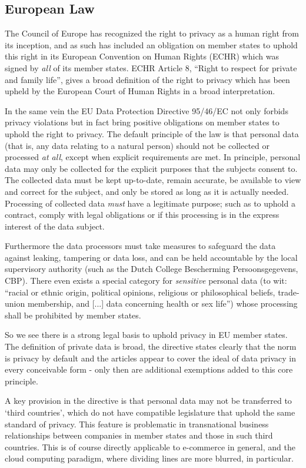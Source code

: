 \documentclass[11pt, a4paper]{article}
\begin{document}
\subsection{European Law}
The Council of Europe has recognized the right to privacy as a human right from its inception, and as such has included an obligation on member states to uphold this right in its European Convention on Human Rights (ECHR) which was signed by \emph{all} of its member states.
ECHR Article 8, ``Right to respect for private and family life'', gives a broad definition of the right to privacy which has been upheld by the European Court of Human Rights in a broad interpretation.

In the same vein the EU Data Protection Directive 95/46/EC not only forbids privacy violations but in fact bring positive obligations on member states to uphold the right to privacy. \cite{directive199595}
The default principle of the law is that personal data (that is, any data relating to a natural person) should not be collected or processed \textit{at all}, except when explicit requirements are met.
In principle, personal data may only be collected for the explicit purposes that the subjects consent to.
The collected data must be kept up-to-date, remain accurate, be available to view and correct for the subject, and only be stored as long as it is actually needed.
Processing of collected data \emph{must} have a legitimate purpose; such as to uphold a contract, comply with legal obligations or if this processing is in the express interest of the data subject.

Furthermore the data processors must take measures to safeguard the data against leaking, tampering or data loss, and can be held accountable by the local supervisory authority (such as the Dutch College Bescherming Persoonsgegevens, CBP).
There even exists a special category for \textit{sensitive} personal data (to wit: ``racial or ethnic origin, political opinions, religious or philosophical beliefs, trade-union membership, and [...] data concerning health or sex life'') whose processing shall be prohibited by member states.

So we see there is a strong legal basis to uphold privacy in EU member states.
The definition of private data is broad, the directive states clearly that the norm is privacy by default and the articles appear to cover the ideal of data privacy in every conceivable form - only then are additional exemptions added to this core principle.

A key provision in the directive is that personal data may not be transferred to `third countries', which do not have compatible legislature that uphold the same standard of privacy.
This feature is problematic in transnational business relationships between companies in member states and those in such third countries.
This is of course directly applicable to e-commerce in general, and the cloud computing paradigm, where dividing lines are more blurred, in particular.
\end{document}
